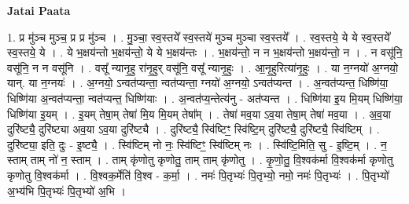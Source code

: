 \documentclass[17pt]{extarticle}
\begin{document}
\textbf{Jatai Paata} \newline

1. प्र मु॑ञ्च मुञ्च॒ प्र प्र मु॑ञ्च । . मु॒ञ्चा॒ स्व॒स्तये᳚ स्व॒स्तये॑ मुञ्च मुञ्चा स्व॒स्तये᳚ । . स्व॒स्तये॒ ये ये स्व॒स्तये᳚ स्व॒स्तये॒ ये । . ये भ॒क्षय॑न्तो भ॒क्षय॑न्तो॒ ये ये भ॒क्षय॑न्तः । . भ॒क्षय॑न्तो॒ न न भ॒क्षय॑न्तो भ॒क्षय॑न्तो॒ न । . न वसू॑नि॒ वसू॑नि॒ न न वसू॑नि । . वसू᳚ न्यानृ॒हु रा॑नृ॒हुर् वसू॑नि॒ वसू᳚ न्यानृ॒हुः । . आ॒नृ॒हुरित्या॑नृ॒हुः । . या न॒ग्नयो॑ अ॒ग्नयो॒ यान्. या न॒ग्नयः॑ । . अ॒ग्नयो॒ ऽन्वत॑प्यन्ता॒ न्वत॑प्यन्ता॒ ग्नयो॑ अ॒ग्नयो॒ ऽन्वत॑प्यन्त । . अ॒न्वत॑प्यन्त॒ धिष्णि॑या॒ धिष्णि॑या अ॒न्वत॑प्यन्ता॒ न्वत॑प्यन्त॒ धिष्णि॑याः । . अ॒न्वत॑प्य॒न्तेत्य॑नु - अत॑प्यन्त । . धिष्णि॑या इ॒य मि॒यम् धिष्णि॑या॒ धिष्णि॑या इ॒यम् । . इ॒यम् तेषा॒म् तेषा॑ मि॒य मि॒यम् तेषा᳚म् । . तेषा॑ मव॒या ऽव॒या तेषा॒म् तेषा॑ मव॒या । . अ॒व॒या दुरि॑ष्ट्यै॒ दुरि॑ष्ट्या अव॒या ऽव॒या दुरि॑ष्ट्यै । . दुरि॑ष्ट्यै॒ स्वि॑ष्टिꣳ॒॒ स्वि॑ष्टि॒म् दुरि॑ष्ट्यै॒ दुरि॑ष्ट्यै॒ स्वि॑ष्टिम् । . दुरि॑ष्ट्या॒ इति॒ दुः - इ॒ष्ट्यै॒ । . स्वि॑ष्टिम् नो नः॒ स्वि॑ष्टिꣳ॒॒ स्वि॑ष्टिम् नः । . स्वि॑ष्टि॒मिति॒ सु - इ॒ष्टि॒म् । . न॒ स्ताम् ताम् नो॑ न॒ स्ताम् । . ताम् कृ॑णोतु कृणोतु॒ ताम् ताम् कृ॑णोतु । . कृ॒णो॒तु॒ वि॒श्वक॑र्मा वि॒श्वक॑र्मा कृणोतु कृणोतु वि॒श्वक॑र्मा । . वि॒श्वक॒र्मेति॑ वि॒श्व - क॒र्मा॒ । . नमः॑ पि॒तृभ्यः॑ पि॒तृभ्यो॒ नमो॒ नमः॑ पि॒तृभ्यः॑ । . पि॒तृभ्यो॑ अ॒भ्य॑भि पि॒तृभ्यः॑ पि॒तृभ्यो॑ अ॒भि । \newline
\end{document}
